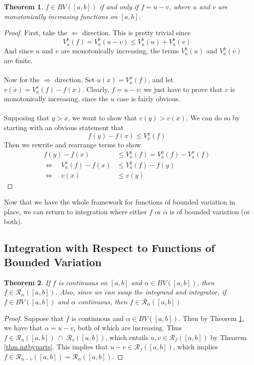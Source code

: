 \documentclass[12pt]{article}
\theoremstyle{plain}
\newtheorem{thm}{Theorem}[subsection]
\theoremstyle{definition}
\theoremstyle{remark}
\begin{document}
\begin{thm}
\label{monot}
$f\in BV([a,b])$ if and only if $f = u-v$, where $u$ and $v$ are monotonically increasing functions on $[a,b]$. 
\end{thm}
\begin{proof}
First, take the $\Leftarrow$ direction. This is pretty trivial since 
    \[ V_a^b(f) = V_a^b(u-v) \leq V_a^b(u) + V_a^b(v) \]
And since $u$ and $v$ are monotonically increasing, the terms $V_a^b(u)$ and $V_a^b(v)$ are finite.
\\
\\
Now for the $\Rightarrow$ direction. Set $u(x) = V_a^x(f)$, and let $v(x)=V_a^x(f) - f(x)$. Clearly, $f = u-v$; we just have to prove that $v$ is monotonically increasing, since the $u$ case is fairly obvious.
\\
\\
Supposing that $y>x$, we want to show that $v(y) > v(x)$. We can do so by starting with an obvious statement that 
    \[ f(y) - f(x) \leq V_x^y(f) \]
Then we rewrite and rearrange terms to show
\begin{align*}
    f(y) - f(x) &\leq V_x^y(f) = V_a^y(f) - V_a^x(f)  \\
    \Leftrightarrow\quad V_a^x(f) - f(x) &\leq V_a^y(f) - f(y)  \\
    \Leftrightarrow\quad v(x) &\leq v(y)  
\end{align*}
\end{proof}
Now that we have the whole framework for functions of bounded variation in place, we can return to integration where either $f$ or $\alpha$ is of bounded variation (or both). 

\subsection{Integration with Respect to Functions of Bounded Variation}

\begin{thm}
If $f$ is continuous on $[a,b]$ and $\alpha\in BV([a,b])$, then $f\in\mathscr{R}_\alpha([a,b])$. Also, since we can swap the integrand and integrator, if $f\in BV([a,b])$ and $\alpha$ continuous, then $f\in\mathscr{R}_\alpha([a,b])$
\end{thm}
\begin{proof}
Suppose that $f$ is continuous and $\alpha\in BV([a,b])$. Then by Theorem \ref{monot}, we have that $\alpha = u -v$, both of which are increasing. Thus $f\in\mathscr{R}_u([a,b]) \;\cap \;\mathscr{R}_v([a,b])$, which entails $u, v \in \mathscr{R}_f([a,b])$ by Theorem \ref{thm.intbyparts}.  This implies that $u-v\in\mathscr{R}_f([a,b])$, which implies $f\in\mathscr{R}_{u-v}([a,b]) = \mathscr{R}_\alpha([a,b])$.
\end{proof}
\end{document}
